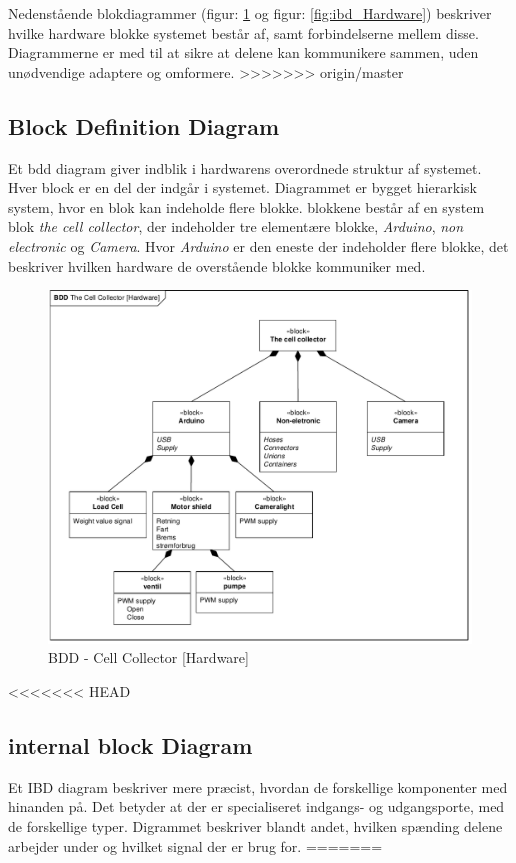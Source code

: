 Nedenstående blokdiagrammer (figur: \ref{fig:bdd_Hardware} og figur: \ref{fig:ibd_Hardware}) beskriver hvilke hardware blokke systemet består af, samt forbindelserne mellem disse. Diagrammerne er med til at sikre at delene kan kommunikere sammen, uden unødvendige adaptere og omformere. 
>>>>>>> origin/master
 
 
 
 
 \newpage
\subsection{Block Definition Diagram} 
Et bdd diagram giver indblik i hardwarens overordnede struktur af systemet. Hver block er en del der indgår i systemet. Diagrammet er bygget hierarkisk system, hvor en blok kan indeholde flere blokke. blokkene består af en system blok \textit{the cell collector}, der indeholder tre elementære blokke, \textit{Arduino}, \textit{non electronic} og \textit{Camera}. Hvor \textit{Arduino} er den eneste der indeholder flere blokke, det beskriver hvilken hardware de overstående blokke kommuniker med.


\begin{figure}[H]
	\centering
	\includegraphics[width=1\textwidth]{pdf/BDD_Hardware_4315_cropped.pdf}
	\caption{BDD - Cell Collector [Hardware]}
	\label{fig:bdd_Hardware}
\end{figure}

<<<<<<< HEAD
\subsection{internal block Diagram} 
Et IBD diagram beskriver mere præcist, hvordan de forskellige komponenter med hinanden på. Det betyder at der er specialiseret indgangs- og udgangsporte, med de forskellige typer. Digrammet beskriver blandt andet, hvilken spænding delene arbejder under og hvilket signal der er brug for.
=======
